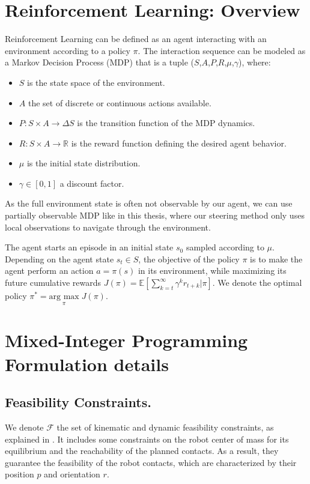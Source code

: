 \appendix

\chapter{Reinforcement Learning: Overview}
\label{appendix:rl_overview}

Reinforcement Learning can be defined as an agent interacting with an environment according to a policy $\pi$. 
The interaction sequence can be modeled as a Markov Decision Process (MDP) that is a tuple ($S$,$A$,$P$,$R$,$\mu$,$\gamma$), where:
\begin{itemize}
    \item $S$ is the state space of the environment.
    \item $A$ the set of discrete or continuous actions available.
    \item $P: S \times A \rightarrow \Delta S$ is the transition function of the MDP dynamics.
    \item $R: S \times A \rightarrow \mathbb{R}$ is the reward function defining the desired agent behavior.
    \item $\mu$ is the initial state distribution.
    \item $\gamma \in [0,1]$ a discount factor.
\end{itemize}

As the full environment state is often not observable by our agent, we can use partially observable MDP like in this thesis, where our steering method only uses local observations to navigate through the environment.

The agent starts an episode in an initial state $s_0$ sampled according to $\mu$.
Depending on the agent state $s_t \in S$, the objective of the policy $\pi$ is to make the agent perform an action $a=\pi(s)$ in its environment, while maximizing its future cumulative rewards $J(\pi) = \mathbb{E}[\sum_{k=t}^{\infty} \gamma^k r_{t+k} | \pi]$.
We denote the optimal policy $\pi^* = \underset{\pi}{\mbox{arg max}} \; J(\pi)$.





\chapter{Mixed-Integer Programming Formulation details}

\section{Feasibility Constraints.\label{appendix:feasibility_constr}}
We denote $\mathcal{F}$ the set of kinematic and dynamic feasibility constraints, as explained in \cite{sl1m_v1}. 
It includes some constraints on the robot center of mass for its equilibrium and the reachability of the planned contacts.
As a result, they guarantee the feasibility of the robot contacts, which are characterized by their position $p$ and orientation $r$.

